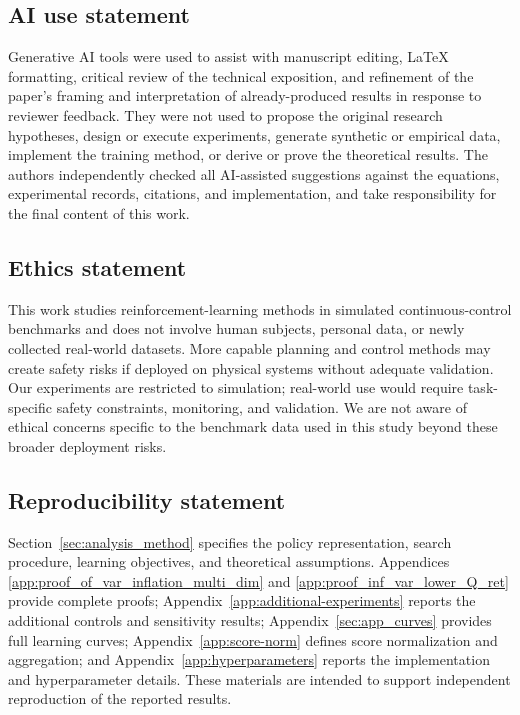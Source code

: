 \subsection*{AI use statement}
Generative AI tools were used to assist with manuscript editing, \LaTeX{}
formatting, critical review of the technical exposition, and refinement of the
paper's framing and interpretation of already-produced results in response to
reviewer feedback. They were not used to propose the original research
hypotheses, design or execute experiments, generate synthetic or empirical
data, implement the training method, or derive or prove the theoretical
results. The authors independently checked all AI-assisted suggestions against
the equations, experimental records, citations, and implementation, and take
responsibility for the final content of this work.

\subsection*{Ethics statement}
This work studies reinforcement-learning methods in simulated continuous-control
benchmarks and does not involve human subjects, personal data, or newly
collected real-world datasets. More capable planning and control methods may
create safety risks if deployed on physical systems without adequate
validation. Our experiments are restricted to simulation; real-world use would
require task-specific safety constraints, monitoring, and validation. We are
not aware of ethical concerns specific to the benchmark data used in this
study beyond these broader deployment risks.

\subsection*{Reproducibility statement}
Section~\ref{sec:analysis_method} specifies the policy representation, search
procedure, learning objectives, and theoretical assumptions. Appendices
\ref{app:proof_of_var_inflation_multi_dim} and
\ref{app:proof_inf_var_lower_Q_ret} provide complete proofs;
Appendix~\ref{app:additional-experiments} reports the additional controls and
sensitivity results; Appendix~\ref{sec:app_curves} provides full learning
curves; Appendix~\ref{app:score-norm} defines score normalization and
aggregation; and Appendix~\ref{app:hyperparameters} reports the implementation
and hyperparameter details. These materials are intended to support independent
reproduction of the reported results.
